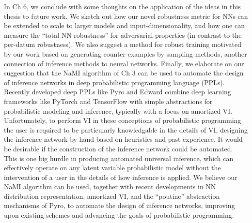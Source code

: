 
In Ch 6, we conclude with some thoughts on the application of the ideas in this thesis to future work. We sketch out how our novel robustness metric for NNs can be extended to scale to larger models and input-dimensionality, and how one can measure the ``total NN robustness'' for adversarial properties (in contrast to the per-datum robustness). We also suggest a method for robust training motivated by our work based on generating counter-examples by sampling methods, another connection of inference methods to neural networks. Finally, we elaborate on our suggestion that the NaMI algorithm of Ch 3 can be used to automate the design of inference networks in deep probabilistic programming language (PPLs). Recently developed deep PPLs like Pyro \citep{bingham2018pyro} and Edward \citep{TranEtAl2016} combine deep learning frameworks like PyTorch and TensorFlow with simple abstractions for probabilistic modeling and inference, typically with a focus on amortized VI. Unfortunately, to perform VI in these conceptions of probabilistic programming the user is required to be particularly knowledgable in the details of VI, designing the inference network by hand based on heuristics and past experience. It would be desirable if the construction of the inference network could be automated. This is one big hurdle in producing automated universal inference, which can effectively operate on any latent variable probabilistic model without the intervention of a user in the details of how inference is applied. We believe our NaMI algorithm can be used, together with recent developments in NN distribution representation, amortized VI, and the ``poutine'' abstraction mechanisms of Pyro, to automate the design of inference networks, improving upon existing schemes and advancing the goals of probabilistic programming.

